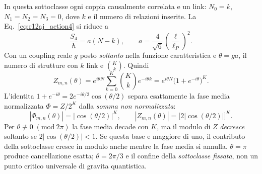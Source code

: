 \documentclass[11pt,a4paper]{article}
\begin{document}
In questa sottoclasse ogni coppia causalmente correlata e un link: $N_0=k$, $N_1=N_2=N_3=0$, dove $k$ e il numero di relazioni inserite. La Eq.~\eqref{eq:r12aj_action4} si riduce a
\begin{equation}\label{eq:r12bb_action}
\frac{S_4}{\hbar}=a(N-k),\qquad
 a=\frac4{\sqrt6}\left(\frac\ell{\ell_P}\right)^2.
\end{equation}
Con un coupling reale $g$ posto \emph{soltanto} nella funzione caratteristica e $\theta=ga$, il numero di strutture con $k$ link e $\binom{K}{k}$. Quindi
\begin{equation}\label{eq:r12bb_partition}
\boxed{\quad Z_{m,n}(\theta)
 =e^{i\theta N}\sum_{k=0}^{K}\binom Kk e^{-i\theta k}
 =e^{i\theta N}\bigl(1+e^{-i\theta}\bigr)^K.\quad}
\end{equation}
L'identita $1+e^{-i\theta}=2e^{-i\theta/2}\cos(\theta/2)$ separa esattamente la fase media normalizzata $\Phi=Z/2^K$ dalla \emph{somma non normalizzata}:
\begin{equation}\label{eq:r12bb_bases}
\boxed{\quad |\Phi_{m,n}(\theta)|=|\cos(\theta/2)|^K,\qquad
 |Z_{m,n}(\theta)|=\bigl[2|\cos(\theta/2)|\bigr]^K.\quad}
\end{equation}
Per $\theta\not\equiv0\;(\mathrm{mod}\ 2\pi)$ la fase media decade con $K$, ma il modulo di $Z$ \emph{decresce} soltanto se $2|\cos(\theta/2)|<1$. Se questa base e maggiore di uno, il contributo della sottoclasse cresce in modulo anche mentre la fase media si annulla. $\theta=\pi$ produce cancellazione esatta; $\theta=2\pi/3$ e il confine della \emph{sottoclasse fissata}, non un punto critico universale di gravita quantistica.
\end{document}
